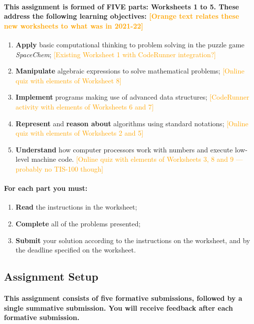 \documentclass{../../fal_assignment}
\begin{document}
\paragraph{This assignment is formed of \textbf{FIVE} parts: Worksheets 1 to 5.
These address the following learning objectives: \textcolor{orange}{[Orange text relates these new worksheets to what was in 2021-22]}}
\begin{enumerate}[label=(\arabic*)]
	\item \textbf{Apply} basic computational thinking to problem solving in the puzzle game \textit{SpaceChem}; \textcolor{orange}{[Existing Worksheet 1 with CodeRunner integration?]}
	\item \textbf{Manipulate} algebraic expressions to solve mathematical problems; \textcolor{orange}{[Online quiz with elements of Worksheet 8]}
	\item \textbf{Implement} programs making use of advanced data structures; \textcolor{orange}{[CodeRunner activity with elements of Worksheets 6 and 7]}
	\item \textbf{Represent} and \textbf{reason about} algorithms using standard notations; \textcolor{orange}{[Online quiz with elements of Worksheets 2 and 5]}
	\item \textbf{Understand} how computer processors work with numbers and execute low-level machine code. \textcolor{orange}{[Online quiz with elements of Worksheets 3, 8 and 9 --- probably no TIS-100 though]}
\end{enumerate}

\paragraph{For each part you must:}
\begin{enumerate}[label=(\roman*)]
    \item \textbf{Read} the instructions in the worksheet;
    \item \textbf{Complete} all of the problems presented;
    \item \textbf{Submit} your solution according to the instructions on the worksheet, and by the deadline specified on the worksheet.
\end{enumerate}

\subsection*{Assignment Setup} 

\paragraph{This assignment consists of \textbf{five formative submissions}, followed by a \textbf{single summative submission}.
You will receive \textbf{feedback} after each formative submission.}
\end{document}
